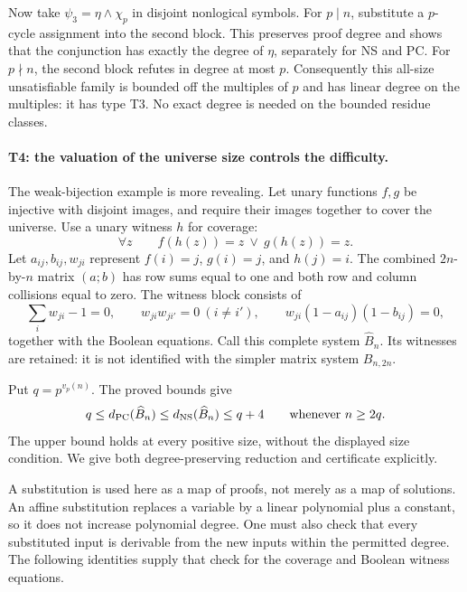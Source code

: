 \documentclass[11pt,a4paper,oneside,openany]{book}
\theoremstyle{definition}\newtheorem{definition}[theorem]{Definition}
\theoremstyle{remark}\newtheorem{remark}[theorem]{Remark}
\numberwithin{equation}{chapter}
\begin{document}
Now take $\psi_3=\eta\wedge\chi_p$ in disjoint nonlogical symbols.
For $p\mid n$, substitute a $p$-cycle assignment into the second block.
This preserves proof degree and shows that the conjunction has exactly the
degree of $\eta$, separately for NS and PC. For $p\nmid n$, the second
block refutes in degree at most $p$. Consequently this all-size
unsatisfiable family is bounded off the multiples of $p$ and has linear
degree on the multiples: it has type T3. No exact degree is needed on the
bounded residue classes.

\paragraph{T4: the valuation of the universe size controls the difficulty.}
The weak-bijection example is more revealing. Let unary functions $f,g$
be injective with disjoint images, and require their images together to
cover the universe. Use a unary witness $h$ for coverage:
\[
 \forall z\qquad f(h(z))=z\ \vee\ g(h(z))=z.
\]
Let $a_{ij},b_{ij},w_{ji}$ represent $f(i)=j$, $g(i)=j$, and $h(j)=i$.
The combined $2n$-by-$n$ matrix $(a;b)$ has row sums equal to one and both
row and column collisions equal to zero. The witness block consists of
\begin{equation}\label{tx:eq:bhat-witness}
 \sum_iw_{ji}-1=0,\qquad
 w_{ji}w_{ji'}=0\ (i\ne i'),\qquad
 w_{ji}(1-a_{ij})(1-b_{ij})=0,
\end{equation}
together with the Boolean equations. Call this complete system
$\widehat B_n$. Its witnesses are retained: it is not identified with the
simpler matrix system $B_{n,2n}$.

Put $q=p^{v_p(n)}$. The proved bounds give
\begin{equation}\label{tx:eq:bhat-window}
 q\leq d_{\mathrm{PC}}(\widehat B_n)
 \leq d_{\mathrm{NS}}(\widehat B_n)\leq q+4
 \qquad\hbox{whenever } n\geq2q.
\end{equation}
The upper bound holds at every positive size, without the displayed size
condition. We give both degree-preserving reduction and certificate
explicitly.

A substitution is used here as a map of proofs, not merely as a map
of solutions. An affine substitution replaces a variable by a linear
polynomial plus a constant, so it does not increase polynomial degree.
One must also check that every substituted input is derivable from the
new inputs within the permitted degree. The following identities supply
that check for the coverage and Boolean witness equations.
\end{document}
